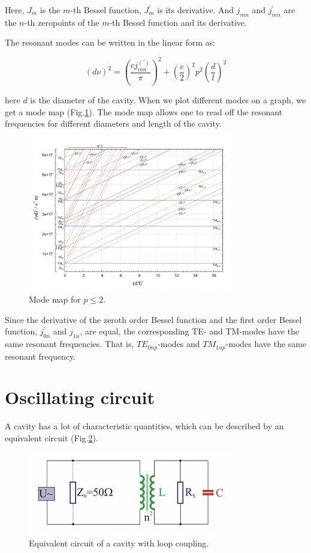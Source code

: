 \documentclass[a4paper]{article}
\numberwithin{equation}{section}
\begin{document}
Here, $J_{m}$ is the $m$-th Bessel function, $J_{m}^{'} $ is its derivative. And
$j_{mn}$ and $j_{mn}^{'}$ are the $n$-th zeropoints of the $m$-th Bessel
function and its derivative.

The resonant modes can be written in the linear form as:

\begin{equation}
		\left(d \nu \right)^2 = \left(\frac{cj_{mn}^{(')}}{\pi}\right)^2 + \left(\frac{c}{2}\right)^2 p^2 \left(\frac{d}{l}\right)^2
\end{equation}

here $d$ is the diameter of the cavity. When we plot different modes on a graph,
we get a mode map (Fig.\ref{fig:mode}). The mode map allows one to read off the
resonant frequencies for different diameters and length of the cavity. 

\begin{figure}[hbt!]
    \centering
    \includegraphics[width=0.8\textwidth]{mode_map}
	\caption{Mode map for $p \leq 2$. \cite{Switka22}}
    \label{fig:mode}
\end{figure}

Since the derivative of the zeroth order Bessel function and the first order
Bessel function, $j^{'}_{0n}$ and $j_{1n}$, are equal, the corresponding TE- and
TM-modes have the same resonant frequencies. That is, $TE_{0np}$-modes and
$TM_{1np}$-modes have the same resonant frequency. 

\section{Oscillating circuit}
A cavity has a lot of characteristic quantities, which can be described by an
equivalent circuit (Fig.\ref{fig:circuit}). 
\begin{figure}[hbt!]
    \centering
    \includegraphics[width=0.8\textwidth]{circuit}
	\caption{Equivalent circuit of a cavity with loop coupling. \cite{Switka22}}
    \label{fig:circuit}
\end{figure}	
\end{document}
